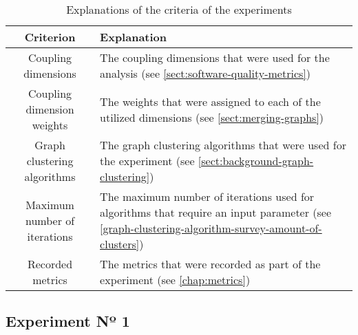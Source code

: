 \documentclass[12pt,a4paper]{report}
\begin{document}
\begin{table}[ht!]
\def\arraystretch{1.55}
\begin{tabularx}{\textwidth}{|c|X|}
\hline
Criterion & Explanation \\
\hline\hline

Coupling dimensions            & The coupling dimensions that were used for the analysis (see \ref{sect:software-quality-metrics}) \\\hline

Coupling dimension weights     & The weights that were assigned to each of the utilized dimensions (see \ref{sect:merging-graphs}) \\\hline

Graph clustering algorithms    & The graph clustering algorithms that were used for the experiment (see \ref{sect:background-graph-clustering}) \\\hline

Maximum number of iterations   & The maximum number of iterations used for algorithms that require an input parameter (see \ref{graph-clustering-algorithm-survey-amount-of-clusters}) \\\hline

Recorded metrics               & The metrics that were recorded as part of the experiment (see \ref{chap:metrics}) \\\hline

\end{tabularx}
\caption{Explanations of the criteria of the experiments}
\label{table:experiment-criteria}
\end{table}


\subsection{Experiment Nº 1}
\end{document}
